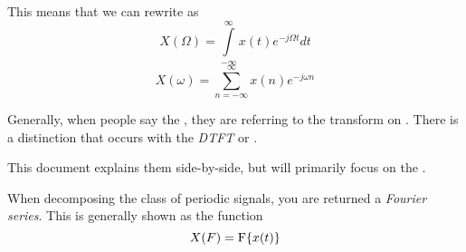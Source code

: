 \begin{definition}
\begin{remark}
    This means that we can rewrite  as
    \begin{equation}\label{eq:FourierTransform-Continuous-Omega}
      X(\Omega) = \int\limits_{-\infty}^{\infty} x(t) e^{-j \Omega t} dt
    \end{equation}
    \begin{equation}\label{eq:FourierTransform-Discrete-Omega}
      X(\omega) = \sum\limits_{n=-\infty}^{\infty} x(n) e^{-j \omega n}
    \end{equation}
  \end{remark}

  \begin{remark}
    Generally, when people say the , they are referring to the transform on .
    There is a distinction that occurs with the \emph{DTFT} or \emph{}.

    This document explains them side-by-side, but will primarily focus on the .
  \end{remark}
\end{definition}

\begin{definition}\label{def:FourierSeries}
  When decomposing the class of periodic signals, you are returned a \emph{Fourier series}.
  This is generally shown as the function
  \begin{equation*}
    X(F) = \operatorname{F} \lbrace x(t) \rbrace
  \end{equation*}
\end{definition}

